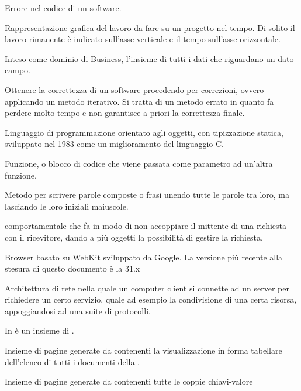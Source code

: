 Errore nel codice di un software.

Rappresentazione grafica del lavoro da fare su un progetto nel tempo. Di solito il lavoro rimanente è indicato sull'asse verticale e il tempo sull'asse orizzontale.

Inteso come dominio di Business, l'insieme di tutti i dati che riguardano un dato campo.

Ottenere la correttezza di un software procedendo per correzioni, ovvero applicando un metodo iterativo. Si tratta di un metodo errato in quanto fa perdere molto tempo e non garantisce a priori la correttezza finale.


Linguaggio di programmazione orientato agli oggetti, con tipizzazione statica, sviluppato nel 1983 come un miglioramento del linguaggio C.

Funzione, o blocco di codice che viene passata come parametro ad un'altra funzione.

Metodo per scrivere parole composte o frasi unendo tutte le parole tra loro, ma lasciando le loro iniziali maiuscole.

 comportamentale che fa in modo di non accoppiare il mittente di una richiesta con il ricevitore, dando a più oggetti la possibilità di gestire la richiesta.

Browser basato su WebKit sviluppato da Google. La versione più recente alla stesura di questo documento è la 31.x

Architettura di rete nella quale un computer client si connette ad un server per richiedere un certo servizio, quale ad esempio la condivisione di una certa risorsa, appoggiandosi ad una suite di protocolli.

In  è un insieme di .

Insieme di pagine generate da \ProjectName{} contenenti la visualizzazione in forma tabellare dell'elenco di tutti i documenti della  .

Insieme di pagine generate da \ProjectName{} contenenti tutte le coppie chiavi-valore

